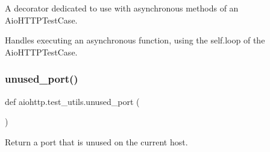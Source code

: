 \begin{DoxyVerb}A decorator dedicated to use with asynchronous methods of an
AioHTTPTestCase.

Handles executing an asynchronous function, using
the self.loop of the AioHTTPTestCase.
\end{DoxyVerb}
 \mbox{\label{namespaceaiohttp_1_1test__utils_a9770c40215cbadb9fa185c34b7fe8935}} 
\subsubsection{\texorpdfstring{unused\+\_\+port()}{unused\_port()}}
{\footnotesize\ttfamily def aiohttp.\+test\+\_\+utils.\+unused\+\_\+port (\begin{DoxyParamCaption}{ }\end{DoxyParamCaption})}

\begin{DoxyVerb}Return a port that is unused on the current host.\end{DoxyVerb}
 